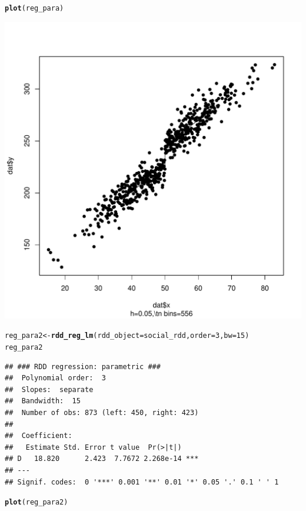 \documentclass[12pt]{article}\usepackage[]{graphicx}\usepackage[]{color}
\makeatletter
\def\maxwidth{ %
  \ifdim\Gin@nat@width>\linewidth
    \linewidth
  \else
    \Gin@nat@width
  \fi
}
\newcommand{\hlnum}[1]{\textcolor[rgb]{0.686,0.059,0.569}{#1}}%
\newcommand{\hlstd}[1]{\textcolor[rgb]{0.345,0.345,0.345}{#1}}%
\newcommand{\hlkwb}[1]{\textcolor[rgb]{0.69,0.353,0.396}{#1}}%
\newcommand{\hlkwc}[1]{\textcolor[rgb]{0.333,0.667,0.333}{#1}}%
\newcommand{\hlkwd}[1]{\textcolor[rgb]{0.737,0.353,0.396}{\textbf{#1}}}%
\newenvironment{kframe}{%
 \def\at@end@of@kframe{}%
 \ifinner\ifhmode%
  \def\at@end@of@kframe{\end{minipage}}%
  \begin{minipage}{\columnwidth}%
 \fi\fi%
 \def\FrameCommand##1{\hskip\@totalleftmargin \hskip-\fboxsep
 \colorbox{shadecolor}{##1}\hskip-\fboxsep
     \hskip-\linewidth \hskip-\@totalleftmargin \hskip\columnwidth}%
 \MakeFramed {\advance\hsize-\width
   \@totalleftmargin\z@ \linewidth\hsize
   \@setminipage}}%
 {\par\unskip\endMakeFramed%
 \at@end@of@kframe}
\newenvironment{knitrout}{}{} %
\makeatother
\begin{document}
\begin{knitrout}
\begin{kframe}
\begin{alltt}
\hlkwd{plot}\hlstd{(reg_para)}
\end{alltt}
\end{kframe}
\includegraphics[width=\maxwidth]{figure/unnamed-chunk-11-2} 
\begin{kframe}\begin{alltt}
\hlstd{reg_para2} \hlkwb{<-} \hlkwd{rdd_reg_lm}\hlstd{(}\hlkwc{rdd_object} \hlstd{= social_rdd,} \hlkwc{order} \hlstd{=} \hlnum{3}\hlstd{,} \hlkwc{bw} \hlstd{=} \hlnum{15}\hlstd{)}
\hlstd{reg_para2}
\end{alltt}
\begin{verbatim}
## ### RDD regression: parametric ###
## 	Polynomial order:  3 
## 	Slopes:  separate 
## 	Bandwidth:  15 
## 	Number of obs: 873 (left: 450, right: 423)
## 
## 	Coefficient:
##   Estimate Std. Error t value  Pr(>|t|)    
## D   18.820      2.423  7.7672 2.268e-14 ***
## ---
## Signif. codes:  0 '***' 0.001 '**' 0.01 '*' 0.05 '.' 0.1 ' ' 1
\end{verbatim}
\begin{alltt}
\hlkwd{plot}\hlstd{(reg_para2)}
\end{alltt}
\end{kframe}

\end{knitrout}
\end{document}
